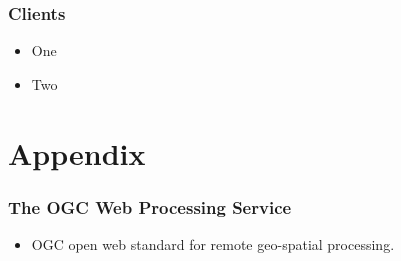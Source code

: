 \documentclass{beamer}
\begin{document}
\begin{frame}
\frametitle<presentation>{Clients}

  \begin{itemize}
    \item One
    \item Two
  \end{itemize}

\end{frame}

\appendix

\section{Appendix}

\begin{frame}
\frametitle<presentation>{The OGC Web Processing Service}

  \begin{itemize}
    \item OGC open web standard for remote geo-spatial processing.
  \end{itemize}
\end{frame}
\end{document}
